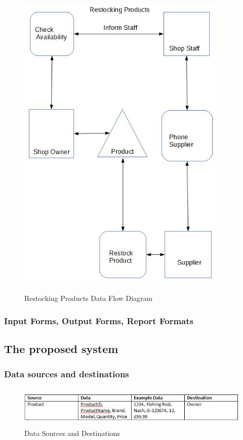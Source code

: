 \begin{figure}[H]
	\centering
	\includegraphics[width= 10cm, height = 15.5cm]{Analysis/images/restock_dfd.JPG}
	\caption {Restocking Products Data Flow Diagram} \label{fig:restocking_data_diagram}
\end{figure}
\subsubsection{Input Forms, Output Forms, Report Formats}

\subsection{The proposed system}

\subsubsection{Data sources and destinations}
\begin{figure}[H]
	\centering
	\includegraphics[width= 15cm, height = 2cm]{Analysis/images/data_sources.JPG}
	\caption {Data Sources and Destinations} \label{fig:data_sources}
\end{figure}
